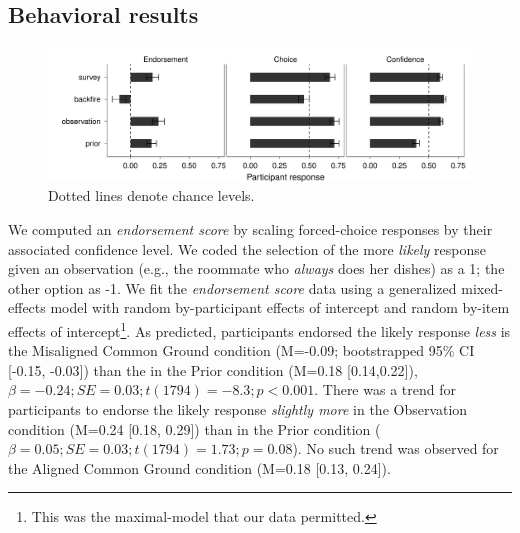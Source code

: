 \documentclass[10pt,letterpaper]{article}
\begin{document}
\subsection{Behavioral results}


\begin{figure}
    \includegraphics[width=\textwidth]{expt1-3responses}
    \caption{Dotted lines denote chance levels.}
  \label{fig:expt1-all}
\end{figure}



We computed an \emph{endorsement score} by scaling forced-choice responses by their associated confidence level. 
We coded the selection of the more \emph{likely} response given an observation (e.g., the roommate who \emph{always} does her dishes) as a 1; the other option as -1.
We fit the \emph{endorsement score} data using a generalized mixed-effects model with random by-participant effects of intercept and random by-item effects of intercept\footnote{This was the maximal-model that our data permitted.}. 
As predicted, participants endorsed the likely response \emph{less} is the Misaligned Common Ground condition (M=-0.09; bootstrapped 95\% CI [-0.15, -0.03]) than the in the Prior condition (M=0.18 [0.14,0.22]), $\beta = -0.24; SE = 0.03; t(1794) = -8.3; p<0.001$.
There was a trend for participants to endorse the likely response \emph{slightly more} in the Observation condition (M=0.24 [0.18, 0.29]) than in the Prior condition ($\beta = 0.05; SE = 0.03; t(1794) = 1.73; p = 0.08$). 
No such trend was observed for the Aligned Common Ground condition (M=0.18 [0.13, 0.24]). 
\end{document}
